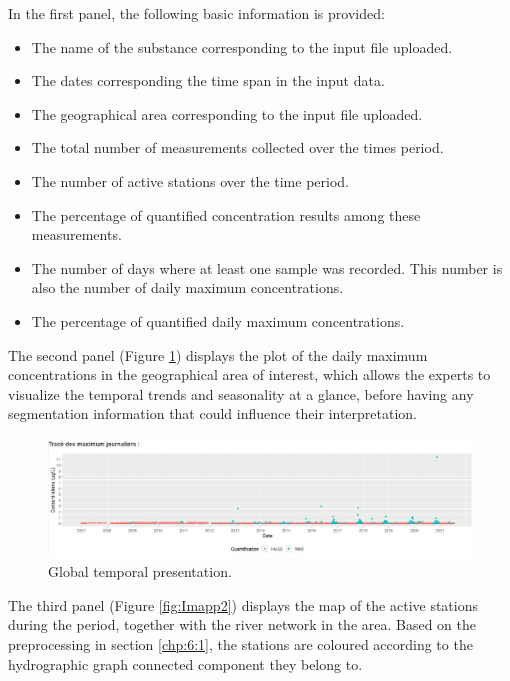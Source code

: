 In the first panel, the following basic information is provided:
\begin{itemize}
\item The name of the substance corresponding to the input file uploaded.
\item The dates corresponding the time span in the input data.
\item The geographical area corresponding to the input file uploaded.
\item The total number of measurements collected over the times period.
\item The number of active stations over the time period.
\item The percentage of quantified concentration results among these measurements. 
\item The number of days where at least one sample was recorded. This number is also the number of daily maximum concentrations. 
\item The percentage of quantified daily maximum concentrations.
\end{itemize}

The second panel (Figure \ref{fig:Imapp1}) displays the plot of the daily maximum concentrations in the geographical area of interest, which allows the experts to visualize the temporal trends and seasonality at a glance, before having any segmentation information that could influence their interpretation.

\begin{figure}[htbp]
  \centering
  \includegraphics[]{figs/Chap6/Im_app1.pdf}
  \caption{Global temporal presentation.}
  \label{fig:Imapp1}
\end{figure}

The third panel (Figure \ref{fig:Imapp2}) displays the map of the active stations during the period, together with the river network in the area. Based on the preprocessing in section \ref{chp:6:1}, the stations are coloured according to the hydrographic graph connected component they belong to. 


